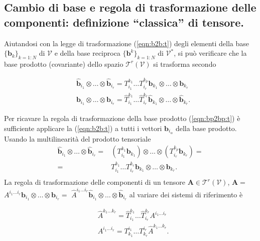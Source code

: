  \subsection{Cambio di base e regola di trasformazione delle componenti: definizione ``classica'' di tensore.} 
%
 Aiutandosi con la legge di trasformazione (\ref{eqn:b2b:t}) degli elementi della base $\{ \bm{b}_k \}_{k=1:N}$ di $\mathcal{V}$ e della base reciproca $\{ \bm{b}^k \}_{k=1:N}$ di $\mathcal{V}^*$, si può verificare  che la base prodotto (covariante) dello spazio $\mathcal{T}^r(\mathcal{V})$ si trasforma secondo
\begin{fBox}
\begin{equation}\label{eqn:bp2bp:t}
\begin{aligned}
 &  \bm{\hat{b}}_{i_1} \otimes \dots \otimes \bm{\hat{b}}_{i_r} = 
  T^{k_1}_{i_1}\dots T^{k_p}_{i_r}
  \bm{b}_{k_1} \otimes \dots \otimes \bm{b}_{k_r} \\
  &  \bm{b}_{i_1} \otimes \dots \otimes \bm{b}_{i_r} = 
  \hat{T}^{k_1}_{i_1}\dots \hat{T}^{k_r}_{i_r}
  \bm{\hat{b}}_{k_1} \otimes \dots \otimes \bm{\hat{b}}_{k_r} .
\end{aligned}
\end{equation}
\end{fBox}
 Per ricavare la regola di trasformazione della base prodotto (\ref{eqn:bp2bp:t}) è sufficiente applicare la (\ref{eqn:b2b:t}) a tutti i vettori $\bm{b}_{i_\alpha}$ della base prodotto.  Usando la multilinearità del prodotto tensoriale
 \begin{equation}
 \begin{aligned}
  \bm{\hat{b}}_{i_1} \otimes \dots \otimes \bm{\hat{b}}_{i_r} = &
  ( T^{k_1}_{i_1}\bm{b}_{k_1} ) \otimes \dots \otimes ( T^{k_p}_{i_r}\bm{b}_{k_r}) = \\
  = & T^{k_1}_{i_1}\dots T^{k_r}_{i_r}
   \bm{b}_{k_1} \otimes \dots \otimes \bm{b}_{k_r} . \\
 \end{aligned}
 \end{equation}
%
 La regola di trasformazione delle componenti di un tensore $\bm{A} \in \mathcal{T}^r(\mathcal{V})$, $\bm{A} =$ $A^{i_1 \dots i_r} \bm{b}_{i_1} \otimes \dots \otimes \bm{b}_{i_r} =$ $\hat{A}^{i_1 \dots i_r} \bm{\hat{b}}_{i_1} \otimes \dots \otimes \bm{\hat{b}}_{i_r} $ al variare dei sistemi di riferimento è
\begin{fBox}
\begin{equation}\label{eqn:t2t:t}
\begin{aligned}
 &  \hat{A}^{k_1 \dots k_r} = 
  \hat{T}^{k_1}_{i_1}\dots \hat{T}^{k_r}_{i_r} A^{i_1 \dots i_r} \\
 &  A^{i_1 \dots i_r} = 
  T^{i_1}_{k_1}\dots T^{i_r}_{k_r} 
  \hat{A}^{k_1 \dots k_r} .
\end{aligned}
\end{equation}
\end{fBox}
